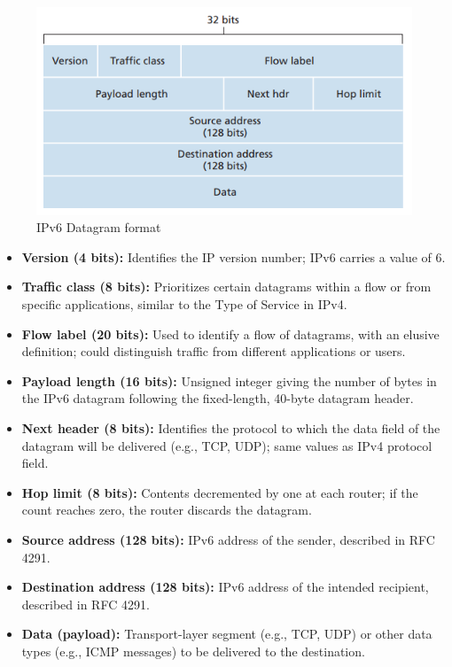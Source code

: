 \vspace{-0.5em}
\begin{figure}[H]
    \centering
    \includegraphics[width = 0.7\linewidth]{img/4/data-plane/IPv6-datagram-format.png}
    \caption{IPv6 Datagram format \cite{Kurose2017}}
    \label{fig:IPv6}
\end{figure}

\begin{itemize}
    \item \textbf{Version (4 bits):} Identifies the IP version number; IPv6 carries a value of 6.
    
    \item \textbf{Traffic class (8 bits):} Prioritizes certain datagrams within a flow or from specific applications, similar to the Type of Service in IPv4.
    
    \item \textbf{Flow label (20 bits):} Used to identify a flow of datagrams, with an elusive definition; could distinguish traffic from different applications or users.
    
    \item \textbf{Payload length (16 bits):} Unsigned integer giving the number of bytes in the IPv6 datagram following the fixed-length, 40-byte datagram header.
    
    \item \textbf{Next header (8 bits):} Identifies the protocol to which the data field of the datagram will be delivered (e.g., TCP, UDP); same values as IPv4 protocol field.
    
    \item \textbf{Hop limit (8 bits):} Contents decremented by one at each router; if the count reaches zero, the router discards the datagram.
    
    \item \textbf{Source address (128 bits):} IPv6 address of the sender, described in RFC 4291.
    
    \item \textbf{Destination address (128 bits):} IPv6 address of the intended recipient, described in RFC 4291.
    
    \item \textbf{Data (payload):} Transport-layer segment (e.g., TCP, UDP) or other data types (e.g., ICMP messages) to be delivered to the destination.
\end{itemize}

